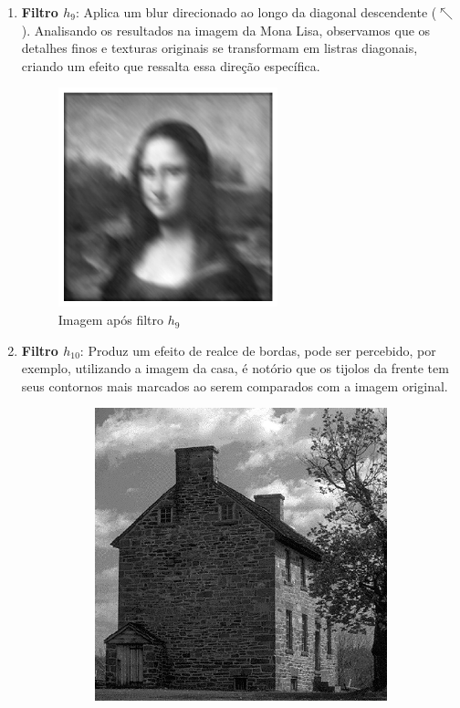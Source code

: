 \documentclass[12pt,a4paper]{report}
\begin{document}
\begin{enumerate}
\begin{figure}[H]
\begin{subfigure}{0.6\textwidth}
        \caption{Imagem após filtro $h_8$}
        \label{fig:cidade_filtro_h8}
      \end{subfigure}
    \end{figure}
    \item \textbf{Filtro $h_9$}: Aplica um blur direcionado ao longo da diagonal descendente ($\nwarrow$ ). Analisando os resultados na imagem da Mona Lisa, observamos que os detalhes finos e texturas originais se transformam em listras diagonais, criando um efeito que ressalta essa direção específica.
    \begin{figure}[H]
      \centering
      \includegraphics[width=0.6\textwidth]{imagens/ex10-09.png}
      \caption{Imagem após filtro $h_9$}
    \end{figure}
    \item \textbf{Filtro $h_{10}$}: Produz um efeito de realce de bordas, pode ser percebido, por exemplo, utilizando a imagem da casa, é notório que os tijolos da frente tem seus contornos mais marcados ao serem comparados com a imagem original.
    \begin{figure}[H]
      \centering
      \begin{subfigure}{0.6\textwidth}
        \includegraphics[width=\linewidth]{imagens/house.png}

\end{subfigure}
\end{figure}
\end{enumerate}
\end{document}
